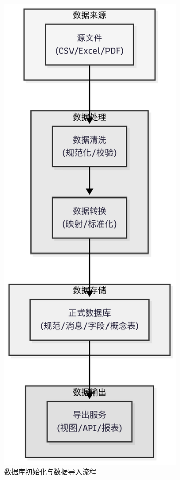 \begin{figure}[H]
  \centering
  \includegraphics[width=0.8\textwidth,height=0.33\textheight,keepaspectratio]{chapters/fig-0/data-import.png}
  \caption{数据库初始化与数据导入流程}
  \label{fig:data-import}
\end{figure}

